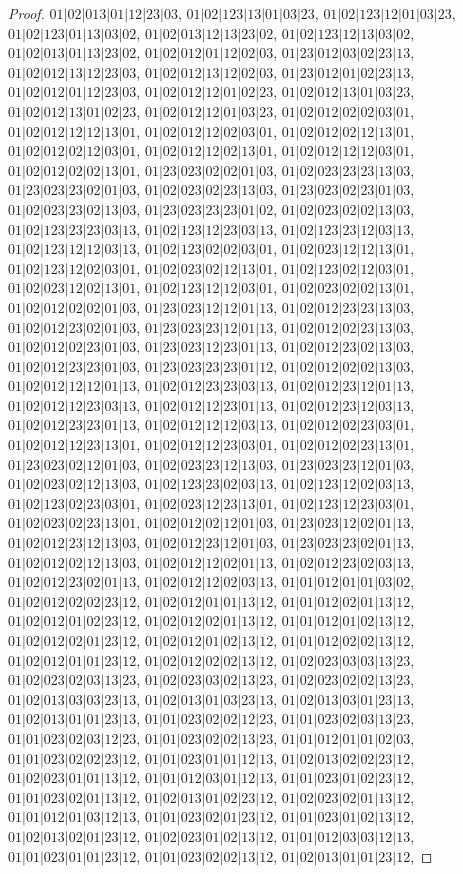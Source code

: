 \documentclass[12pt]{article}
\theoremstyle{plain}
\theoremstyle{definition}
\theoremstyle{remark}
\begin{document}
\begin{proof}
$01|02|013|01|12|23|03$, $01|02|123|13|01|03|23$, $01|02|123|12|01|03|23$, $01|02|123|01|13|03|02$, $01|02|013|12|13|23|02$, $01|02|123|12|13|03|02$, $01|02|013|01|13|23|02$, $01|02|012|01|12|02|03$, $01|23|012|03|02|23|13$, $01|02|012|13|12|23|03$, $01|02|012|13|12|02|03$, $01|23|012|01|02|23|13$, $01|02|012|01|12|23|03$, $01|02|012|12|01|02|23$, $01|02|012|13|01|03|23$, $01|02|012|13|01|02|23$, $01|02|012|12|01|03|23$, $01|02|012|02|02|03|01$, $01|02|012|12|12|13|01$, $01|02|012|12|02|03|01$, $01|02|012|02|12|13|01$, $01|02|012|02|12|03|01$, $01|02|012|12|02|13|01$, $01|02|012|12|12|03|01$, $01|02|012|02|02|13|01$, $01|23|023|02|02|01|03$, $01|02|023|23|23|13|03$, $01|23|023|23|02|01|03$, $01|02|023|02|23|13|03$, $01|23|023|02|23|01|03$, $01|02|023|23|02|13|03$, $01|23|023|23|23|01|02$, $01|02|023|02|02|13|03$, $01|02|123|23|23|03|13$, $01|02|123|12|23|03|13$, $01|02|123|23|12|03|13$, $01|02|123|12|12|03|13$, $01|02|123|02|02|03|01$, $01|02|023|12|12|13|01$, $01|02|123|12|02|03|01$, $01|02|023|02|12|13|01$, $01|02|123|02|12|03|01$, $01|02|023|12|02|13|01$, $01|02|123|12|12|03|01$, $01|02|023|02|02|13|01$, $01|02|012|02|02|01|03$, $01|23|023|12|12|01|13$, $01|02|012|23|23|13|03$, $01|02|012|23|02|01|03$, $01|23|023|23|12|01|13$, $01|02|012|02|23|13|03$, $01|02|012|02|23|01|03$, $01|23|023|12|23|01|13$, $01|02|012|23|02|13|03$, $01|02|012|23|23|01|03$, $01|23|023|23|23|01|12$, $01|02|012|02|02|13|03$, $01|02|012|12|12|01|13$, $01|02|012|23|23|03|13$, $01|02|012|23|12|01|13$, $01|02|012|12|23|03|13$, $01|02|012|12|23|01|13$, $01|02|012|23|12|03|13$, $01|02|012|23|23|01|13$, $01|02|012|12|12|03|13$, $01|02|012|02|23|03|01$, $01|02|012|12|23|13|01$, $01|02|012|12|23|03|01$, $01|02|012|02|23|13|01$, $01|23|023|02|12|01|03$, $01|02|023|23|12|13|03$, $01|23|023|23|12|01|03$, $01|02|023|02|12|13|03$, $01|02|123|23|02|03|13$, $01|02|123|12|02|03|13$, $01|02|123|02|23|03|01$, $01|02|023|12|23|13|01$, $01|02|123|12|23|03|01$, $01|02|023|02|23|13|01$, $01|02|012|02|12|01|03$, $01|23|023|12|02|01|13$, $01|02|012|23|12|13|03$, $01|02|012|23|12|01|03$, $01|23|023|23|02|01|13$, $01|02|012|02|12|13|03$, $01|02|012|12|02|01|13$, $01|02|012|23|02|03|13$, $01|02|012|23|02|01|13$, $01|02|012|12|02|03|13$, $01|01|012|01|01|03|02$, $01|02|012|02|02|23|12$, $01|02|012|01|01|13|12$, $01|01|012|02|01|13|12$, $01|02|012|01|02|23|12$, $01|02|012|02|01|13|12$, $01|01|012|01|02|13|12$, $01|02|012|02|01|23|12$, $01|02|012|01|02|13|12$, $01|01|012|02|02|13|12$, $01|02|012|01|01|23|12$, $01|02|012|02|02|13|12$, $01|02|023|03|03|13|23$, $01|02|023|02|03|13|23$, $01|02|023|03|02|13|23$, $01|02|023|02|02|13|23$, $01|02|013|03|03|23|13$, $01|02|013|01|03|23|13$, $01|02|013|03|01|23|13$, $01|02|013|01|01|23|13$, $01|01|023|02|02|12|23$, $01|01|023|02|03|13|23$, $01|01|023|02|03|12|23$, $01|01|023|02|02|13|23$, $01|01|012|01|01|02|03$, $01|01|023|02|02|23|12$, $01|01|023|01|01|12|13$, $01|02|013|02|02|23|12$, $01|02|023|01|01|13|12$, $01|01|012|03|01|12|13$, $01|01|023|01|02|23|12$, $01|01|023|02|01|13|12$, $01|02|013|01|02|23|12$, $01|02|023|02|01|13|12$, $01|01|012|01|03|12|13$, $01|01|023|02|01|23|12$, $01|01|023|01|02|13|12$, $01|02|013|02|01|23|12$, $01|02|023|01|02|13|12$, $01|01|012|03|03|12|13$, $01|01|023|01|01|23|12$, $01|01|023|02|02|13|12$, $01|02|013|01|01|23|12$, 
\end{proof}
\end{document}
